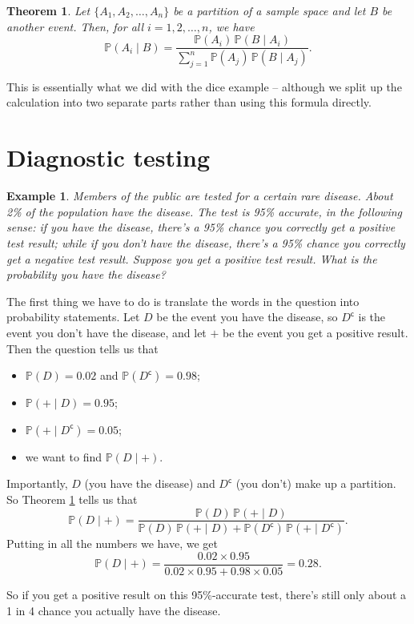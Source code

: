 \documentclass[
  a4paper,
]{book}
\providecommand{\tightlist}{%
  \setlength{\itemsep}{0pt}\setlength{\parskip}{0pt}}
\newtheorem{theorem}{Theorem}[chapter]
\theoremstyle{definition}
\theoremstyle{definition}
\newtheorem{example}{Example}[chapter]
\theoremstyle{definition}
\theoremstyle{definition}
\theoremstyle{remark}
\begin{document}
\begin{theorem}
\protect\hypertarget{thm:bayes-total}{}\label{thm:bayes-total}Let \(\{A_1, A_2, \dots, A_n\}\) be a partition of a sample space and let \(B\) be another event. Then, for all \(i=1,2,\dots,n\), we have
\[ \mathbb P(A_i \mid B) = \frac{\mathbb P(A_i) \,\mathbb P(B \mid A_i)}{\sum_{j=1}^n \mathbb P(A_j) \, \mathbb P(B \mid A_j)} .  \]
\end{theorem}

This is essentially what we did with the dice example -- although we split up the calculation into two separate parts rather than using this formula directly.

\hypertarget{screening}{%
\section{Diagnostic testing}\label{screening}}

\begin{example}
\emph{Members of the public are tested for a certain rare disease. About 2\% of the population have the disease. The test is 95\% accurate, in the following sense: if you have the disease, there's a 95\% chance you correctly get a positive test result; while if you don't have the disease, there's a 95\% chance you correctly get a negative test result. Suppose you get a positive test result. What is the probability you have the disease?}

The first thing we have to do is translate the words in the question into probability statements. Let \(D\) be the event you have the disease, so \(D^\mathsf{c}\) is the event you don't have the disease, and let \(+\) be the event you get a positive result. Then the question tells us that

\begin{itemize}
\tightlist
\item
  \(\mathbb P(D) = 0.02\) and \(\mathbb P(D^\mathsf{c}) = 0.98\);
\item
  \(\mathbb P({+} \mid D) = 0.95\);
\item
  \(\mathbb P({+}\mid D^\mathsf{c}) = 0.05\);
\item
  we want to find \(\mathbb P(D \mid {+})\).
\end{itemize}

Importantly, \(D\) (you have the disease) and \(D^\mathsf{c}\) (you don't) make up a partition. So Theorem \ref{thm:bayes-total} tells us that
\[  \mathbb P(D \mid {+}) = \frac{\mathbb P(D) \,\mathbb P({+} \mid D)}{\mathbb P(D) \,\mathbb P({+} \mid D)+\mathbb P(D^\mathsf{c}) \,\mathbb P({+} \mid D^\mathsf{c})} . \]
Putting in all the numbers we have, we get
\[ \mathbb P(D \mid {+}) = \frac{0.02 \times 0.95}{0.02 \times 0.95 + 0.98 \times 0.05} = 0.28 .\]

So if you get a positive result on this 95\%-accurate test, there's still only about a 1 in 4 chance you actually have the disease.
\end{example}
\end{document}
